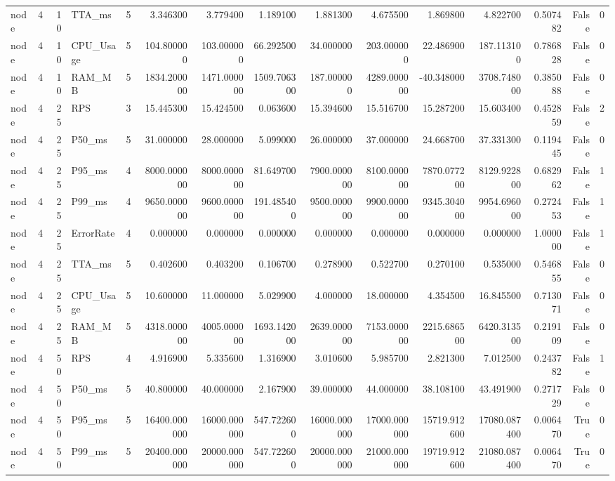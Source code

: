 \begin{tabular}{lrrlrrrrrrrrrrr}
node & 4 & 10 & TTA_ms & 5 & 3.346300 & 3.779400 & 1.189100 & 1.881300 & 4.675500 & 1.869800 & 4.822700 & 0.507482 & False & 0 \\
node & 4 & 10 & CPU_Usage & 5 & 104.800000 & 103.000000 & 66.292500 & 34.000000 & 203.000000 & 22.486900 & 187.113100 & 0.786828 & False & 0 \\
node & 4 & 10 & RAM_MB & 5 & 1834.200000 & 1471.000000 & 1509.706300 & 187.000000 & 4289.000000 & -40.348000 & 3708.748000 & 0.385088 & False & 0 \\
node & 4 & 25 & RPS & 3 & 15.445300 & 15.424500 & 0.063600 & 15.394600 & 15.516700 & 15.287200 & 15.603400 & 0.452859 & False & 2 \\
node & 4 & 25 & P50_ms & 5 & 31.000000 & 28.000000 & 5.099000 & 26.000000 & 37.000000 & 24.668700 & 37.331300 & 0.119445 & False & 0 \\
node & 4 & 25 & P95_ms & 4 & 8000.000000 & 8000.000000 & 81.649700 & 7900.000000 & 8100.000000 & 7870.077200 & 8129.922800 & 0.682962 & False & 1 \\
node & 4 & 25 & P99_ms & 4 & 9650.000000 & 9600.000000 & 191.485400 & 9500.000000 & 9900.000000 & 9345.304000 & 9954.696000 & 0.272453 & False & 1 \\
node & 4 & 25 & ErrorRate & 4 & 0.000000 & 0.000000 & 0.000000 & 0.000000 & 0.000000 & 0.000000 & 0.000000 & 1.000000 & False & 1 \\
node & 4 & 25 & TTA_ms & 5 & 0.402600 & 0.403200 & 0.106700 & 0.278900 & 0.522700 & 0.270100 & 0.535000 & 0.546855 & False & 0 \\
node & 4 & 25 & CPU_Usage & 5 & 10.600000 & 11.000000 & 5.029900 & 4.000000 & 18.000000 & 4.354500 & 16.845500 & 0.713071 & False & 0 \\
node & 4 & 25 & RAM_MB & 5 & 4318.000000 & 4005.000000 & 1693.142000 & 2639.000000 & 7153.000000 & 2215.686500 & 6420.313500 & 0.219109 & False & 0 \\
node & 4 & 50 & RPS & 4 & 4.916900 & 5.335600 & 1.316900 & 3.010600 & 5.985700 & 2.821300 & 7.012500 & 0.243782 & False & 1 \\
node & 4 & 50 & P50_ms & 5 & 40.800000 & 40.000000 & 2.167900 & 39.000000 & 44.000000 & 38.108100 & 43.491900 & 0.271729 & False & 0 \\
node & 4 & 50 & P95_ms & 5 & 16400.000000 & 16000.000000 & 547.722600 & 16000.000000 & 17000.000000 & 15719.912600 & 17080.087400 & 0.006470 & True & 0 \\
node & 4 & 50 & P99_ms & 5 & 20400.000000 & 20000.000000 & 547.722600 & 20000.000000 & 21000.000000 & 19719.912600 & 21080.087400 & 0.006470 & True & 0 \\

\end{tabular}

